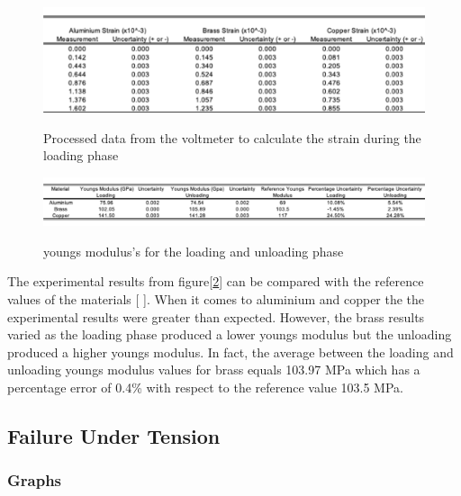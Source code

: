 \documentclass[a4paper,10pt]{article}
\begin{document}
\begin{figure}[!]
\centering
\caption{Processed data from the voltmeter to calculate the strain during the loading phase}
\includegraphics[width=\textwidth]{processed_stress_gauge.png}
\label{Fig5}
\end{figure}

\begin{figure}[!]
\centering
\caption{youngs modulus's for the loading and unloading phase}
\includegraphics[width=\textwidth]{final_result.png}
\label{Fig6}
\end{figure}

The experimental results from figure[\ref{Fig6}] can be compared with the reference values of the materials [ ]. When it comes to aluminium and copper the the experimental results were greater than expected. However, the brass results varied as the loading phase produced a lower youngs modulus but the unloading produced a higher youngs modulus. In fact, the average between the loading and unloading youngs modulus values for brass equals 103.97 MPa which has a percentage error of 0.4\% with respect to the reference value 103.5 MPa. \newpage


\subsection{Failure Under Tension}
\subsubsection{Graphs}
\end{document}
